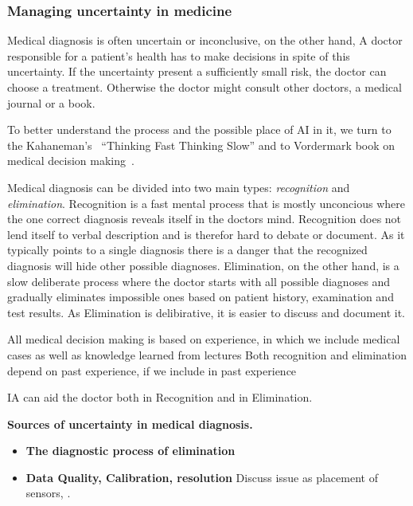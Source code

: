 \documentclass[11pt]{pnas-new}
\begin{document}
\subsubsection*{Managing uncertainty in medicine}
Medical diagnosis is often uncertain or inconclusive, on the other
hand, A doctor responsible for a patient's health has to make
decisions in spite of this uncertainty. If the uncertainty present a
sufficiently small risk, the doctor can choose a treatment. Otherwise
the doctor might consult other doctors, a medical journal or a book. 

To better understand the process and the possible place of AI in it,
we turn to the Kahaneman's~\cite{kahneman2011thinking} ``Thinking Fast Thinking Slow'' and
to Vordermark book on medical decision
making~\cite{vordermark2019introduction}.

Medical diagnosis can be divided into two main types: {\em
  recognition} and {\em elimination}. Recognition is a fast mental
process that is mostly unconcious where the one correct diagnosis reveals
itself in the doctors mind. Recognition does not lend itself to verbal
description and is therefor hard to debate or document. As it
typically points to a single diagnosis there is a danger that the
recognized diagnosis will hide other possible diagnoses.
Elimination, on the other hand, is a slow deliberate process where the
doctor starts with all possible diagnoses and gradually eliminates
impossible ones based on patient history, examination and test
results. As Elimination is delibirative, it is easier to discuss and
document it.

All medical decision making is based on experience, in which we
include medical cases as well as knowledge learned from lectures 
Both recognition and elimination depend on past experience, if we
include in past experience 

IA can aid the doctor both in Recognition and in Elimination. 

{\bf Sources of uncertainty in medical diagnosis.}
\begin{itemize}
  \item{\bf The diagnostic process of elimination}
  \item{\bf Data Quality, Calibration, resolution} Discuss issue as placement of sensors, .
  \end{itemize}
\end{document}
